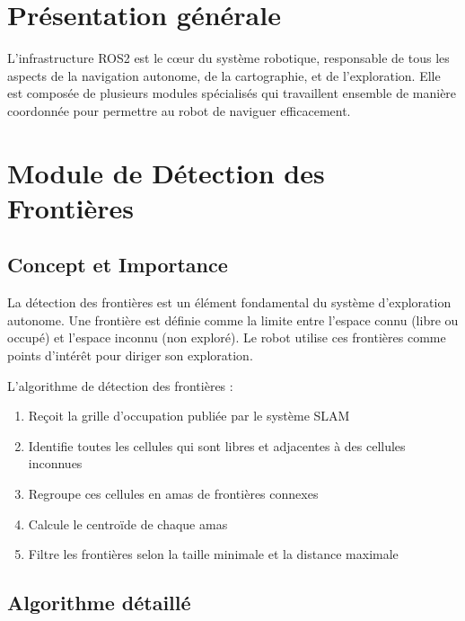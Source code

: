 \documentclass[12pt,a4paper,oneside]{report}
\begin{document}
\section{Présentation générale}

L'infrastructure ROS2 est le cœur du système robotique, responsable de tous les aspects de la navigation autonome, de la cartographie, et de l'exploration. Elle est composée de plusieurs modules spécialisés qui travaillent ensemble de manière coordonnée pour permettre au robot de naviguer efficacement.

\section{Module de Détection des Frontières}

\subsection{Concept et Importance}

La détection des frontières est un élément fondamental du système d'exploration autonome. Une frontière est définie comme la limite entre l'espace connu (libre ou occupé) et l'espace inconnu (non exploré). Le robot utilise ces frontières comme points d'intérêt pour diriger son exploration.

L'algorithme de détection des frontières :

\begin{enumerate}
  \item Reçoit la grille d'occupation publiée par le système SLAM
  \item Identifie toutes les cellules qui sont libres et adjacentes à des cellules inconnues
  \item Regroupe ces cellules en amas de frontières connexes
  \item Calcule le centroïde de chaque amas
  \item Filtre les frontières selon la taille minimale et la distance maximale
\end{enumerate}

\subsection{Algorithme détaillé}
\end{document}
